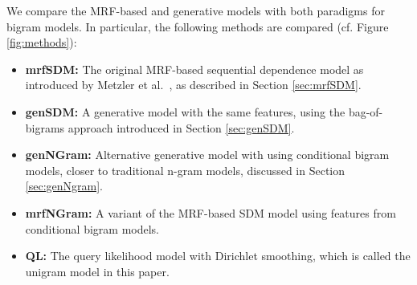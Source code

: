 \documentclass[]{article}
\begin{document}
We compare the MRF-based and generative models with both paradigms
for bigram models. In particular, the following methods are compared
(cf. Figure \ref{fig:methods}):
\begin{itemize}[leftmargin=5mm]
\item \textbf{mrfSDM:} The original MRF-based sequential dependence model as introduced
by Metzler et al.\ \cite{metzler2005sdm}, as described in Section \ref{sec:mrfSDM}.
\item \textbf{genSDM:} A generative model with the same features, using the bag-of-bigrams
approach introduced in Section \ref{sec:genSDM}.
\item \textbf{genNGram:} Alternative generative model with using conditional bigram
models, closer to traditional n-gram models, discussed in Section
\ref{sec:genNgram}.
\item \textbf{mrfNGram:} A variant of the MRF-based SDM model using features from
conditional bigram models.
\item \textbf{QL:} The query likelihood model with Dirichlet smoothing, which is called the unigram
model in this paper.
\end{itemize}
\end{document}
